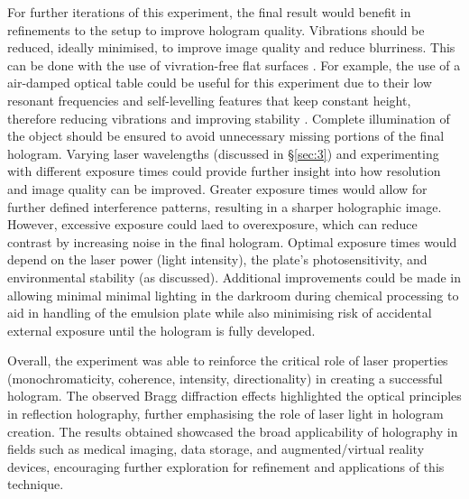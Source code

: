 \documentclass[12pt]{article}
\begin{document}
For further iterations of this experiment, the final result would benefit in refinements to the setup to improve hologram quality. Vibrations should be reduced, ideally minimised, to improve image quality and reduce blurriness. This can be done with the use of vivration-free flat surfaces \cite{UCDholo,princetonholo}.
For example, the use of a air-damped optical table could be useful for this experiment due to their low resonant frequencies and self-levelling features that keep constant height, therefore reducing vibrations and improving stability \cite{opticaltable}.
Complete illumination of the object should be ensured to avoid unnecessary missing portions of the final hologram. Varying laser wavelengths (discussed in §\ref{sec:3}) and experimenting with different exposure times could provide further insight into how resolution and image quality can be improved. Greater exposure times
would allow for further defined interference patterns, resulting in a sharper holographic image. However, excessive exposure could laed to overexposure, which can reduce contrast by increasing noise in the final hologram. Optimal exposure times would depend on the laser power (light intensity), the plate's photosensitivity, and environmental stability (as discussed).
Additional improvements could be made in allowing minimal minimal lighting in the darkroom during chemical processing to aid in handling of the emulsion plate while also minimising risk of accidental external exposure until the hologram is fully developed.

Overall, the experiment was able to reinforce the critical role of laser properties (monochromaticity, coherence, intensity, directionality) in creating a successful hologram. The observed Bragg diffraction effects highlighted the
optical principles in reflection holography, further emphasising the role of laser light in hologram creation. The results obtained showcased the broad applicability of holography in fields such as medical imaging, data storage, and augmented/virtual reality devices, encouraging
further exploration for refinement and applications of this technique.

\newpage



 \label{sec:ref}

\vspace{1.5cm}

\listoffigures
\end{document}
